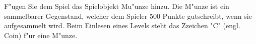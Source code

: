 F"ugen Sie dem Spiel das Spielobjekt Mu"unze hinzu. Die M"unze ist ein sammelbarer Gegenstand, welcher dem Spieler 500 Punkte gutschreibt, wenn sie aufgesammelt wird.
Beim Einlesen eines Levels steht das Zzeichen "C" (engl. Coin) f"ur eine M"unze.